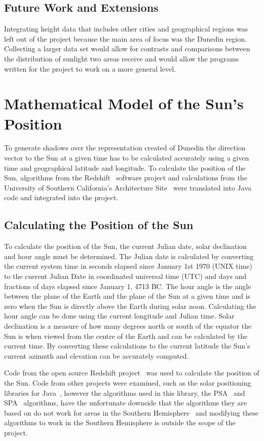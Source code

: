 \documentclass[12pt]{report}
\begin{document}
\subsection{Future Work and Extensions}
Integrating height data that includes other cities and geographical regions was left out of the project because the main area of focus was the Dunedin region. Collecting a larger data set would allow for contrasts and comparisons between the distribution of sunlight two areas receive and would allow the programs written for the project to work on a more general level.

\section{Mathematical Model of the Sun's Position}
To generate shadows over the representation created of Dunedin the direction vector to the Sun at a given time has to be calculated accurately using a given time and geographical latitude and longitude. To calculate the position of the Sun, algorithms from the Redshift~\cite{redshift} software project and calculations from the University of Southern California's Architecture Site~\cite{solarazi} were translated into Java code and integrated into the project.

\subsection{Calculating the Position of the Sun}
To calculate the position of the Sun, the current Julian date, solar declination and hour angle must be determined. The Julian date is calculated by converting the current system time in seconds elapsed since January 1st 1970 (UNIX time) to the current Julian Date in coordinated universal time (UTC) and days and fractions of days elapsed since January 1, 4713 BC. The hour angle is the angle between the plane of the Earth and the plane of the Sun at a given time and is zero when the Sun is directly above the Earth during solar noon. Calculating the hour angle can be done using the current longitude and Julian time. Solar declination is a measure of how many degrees north or south of the equator the Sun is when viewed from the centre of the Earth and can be calculated by the current time. By converting these calculations to the current latitude the Sun's current azimuth and elevation can be accurately computed.

Code from the open source Redshift project~\cite{redshift} was used to calculate the position of the Sun.  Code from other projects were examined, such as the solar positioning libraries for Java~\cite{javasunlib}, however the algorithms used in this library, the PSA~\cite{psa} and SPA~\cite{spa} algorithms, have the unfortunate downside that the algorithms they are based on do not work for areas in the Southern Hemisphere~\cite{southsun} and modifying these algorithms to work in the Southern Hemisphere is outside the scope of the project.
\end{document}
